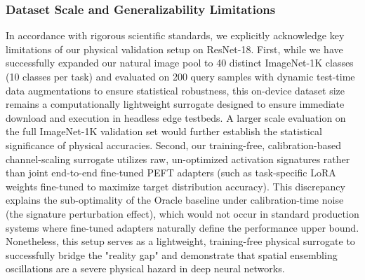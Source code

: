 \subsubsection{Dataset Scale and Generalizability Limitations}
In accordance with rigorous scientific standards, we explicitly acknowledge key limitations of our physical validation setup on ResNet-18. First, while we have successfully expanded our natural image pool to 40 distinct ImageNet-1K classes (10 classes per task) and evaluated on 200 query samples with dynamic test-time data augmentations to ensure statistical robustness, this on-device dataset size remains a computationally lightweight surrogate designed to ensure immediate download and execution in headless edge testbeds. A larger scale evaluation on the full ImageNet-1K validation set would further establish the statistical significance of physical accuracies. Second, our training-free, calibration-based channel-scaling surrogate utilizes raw, un-optimized activation signatures rather than joint end-to-end fine-tuned PEFT adapters (such as task-specific LoRA weights fine-tuned to maximize target distribution accuracy). This discrepancy explains the sub-optimality of the Oracle baseline under calibration-time noise (the signature perturbation effect), which would not occur in standard production systems where fine-tuned adapters naturally define the performance upper bound. Nonetheless, this setup serves as a lightweight, training-free physical surrogate to successfully bridge the "reality gap" and demonstrate that spatial ensembling oscillations are a severe physical hazard in deep neural networks.

